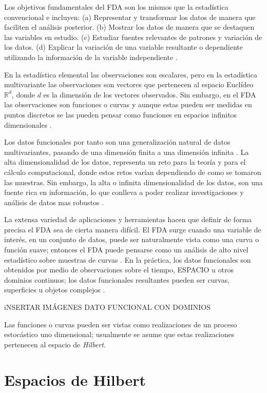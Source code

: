 \documentclass[
]{book}
\begin{document}
Los objetivos fundamentales del FDA son los mismos que la estadística convencional e incluyen: (a) Representar y transformar los datos de manera que faciliten el análisis posterior. (b) Mostrar los datos de manera que se destaquen las variables en estudio. (c) Estudiar fuentes relevantes de patrones y variación de los datos. (d) Explicar la variación de una variable resultante o dependiente utilizando la información de la variable independiente \citep{raichle}.

En la estadística elemental las observaciones son escalares, pero en la estadística multivariante las observaciones son vectores que pertenecen al espacio Euclídeo \(\mathbb{R}^d\), donde \(d\) es la dimensión de los vectores observados. Sin embargo, en el FDA las observaciones son funciones o curvas y aunque estas pueden ser medidas en puntos discretos se las pueden pensar como funciones en espacios infinitos dimensionales \citep{kokoska}.

Los datos funcionales por tanto son una generalización natural de datos multivariantes, pasando de una dimensión finita a una dimensión infinita \citep{jin}. La alta dimensionalidad de los datos, representa un reto para la teoría y para el cálculo computacional, donde estos retos varían dependiendo de como se tomaron las muestras. Sin embargo, la alta o infinita dimensionalidad de los datos, son una fuente rica en información, lo que conlleva a poder realizar investigaciones y análisis de datos mas robustos \citep{wang}.

La extensa variedad de aplicaciones y herramientas hacen que definir de forma precisa el FDA sea de cierta manera difícil. El FDA surge cuando una variable de interés, en un conjunto de datos, puede ser naturalmente vista como una curva o función suave; entonces el FDA puede pensarse como un análisis de alto nivel estadístico sobre muestras de curvas \citep{kokoska}. En la práctica, los datos funcionales son obtenidos por medio de observaciones sobre el tiempo, {ESPACIO} u otros dominios continuos; los datos funcionales resultantes pueden ser curvas, superficies u objetos complejos \citep{jin}.

{iNSERTAR IMÁGENES DATO FUNCIONAL CON DOMINIOS}

Las funciones o curvas pueden ser vistas como realizaciones de un proceso estocástico uno dimensional; usualmente se asume que estas realizaciones pertenecen al espacio de \emph{Hilbert}.\\

\hypertarget{espacios-de-hilbert}{%
\section{Espacios de Hilbert}\label{espacios-de-hilbert}}
\end{document}
